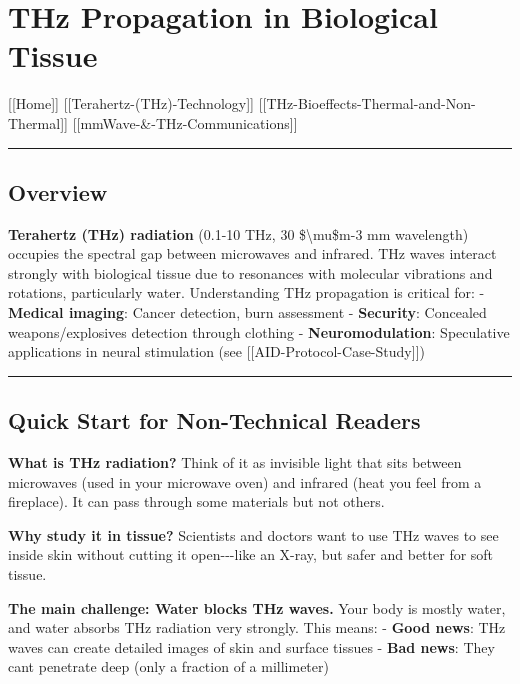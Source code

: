 \section{THz Propagation in Biological
Tissue}\label{thz-propagation-in-biological-tissue}

{[}{[}Home{]}{]} \textbar{} {[}{[}Terahertz-(THz)-Technology{]}{]}
\textbar{} {[}{[}THz-Bioeffects-Thermal-and-Non-Thermal{]}{]} \textbar{}
{[}{[}mmWave-\&-THz-Communications{]}{]}

\begin{center}\rule{0.5\linewidth}{0.5pt}\end{center}

\subsection{Overview}\label{overview}

\textbf{Terahertz (THz) radiation} (0.1-10 THz, 30
\$\textbackslash mu\$m-3 mm wavelength) occupies the spectral gap
between microwaves and infrared. THz waves interact strongly with
biological tissue due to resonances with molecular vibrations and
rotations, particularly water. Understanding THz propagation is critical
for: - \textbf{Medical imaging}: Cancer detection, burn assessment -
\textbf{Security}: Concealed weapons/explosives detection through
clothing - \textbf{Neuromodulation}: Speculative applications in neural
stimulation (see {[}{[}AID-Protocol-Case-Study{]}{]})

\begin{center}\rule{0.5\linewidth}{0.5pt}\end{center}

\subsection{Quick Start for Non-Technical
Readers}\label{quick-start-for-non-technical-readers}

\textbf{What is THz radiation?} Think of it as invisible light that sits
between microwaves (used in your microwave oven) and infrared (heat you
feel from a fireplace). It can pass through some materials but not
others.

\textbf{Why study it in tissue?} Scientists and doctors want to use THz
waves to see inside skin without cutting it open-\/-\/-like an X-ray,
but safer and better for soft tissue.

\textbf{The main challenge: Water blocks THz waves.} Your body is mostly
water, and water absorbs THz radiation very strongly. This means: -
\textbf{Good news}: THz waves can create detailed images of skin and
surface tissues - \textbf{Bad news}: They can\textquotesingle t
penetrate deep (only a fraction of a millimeter)

